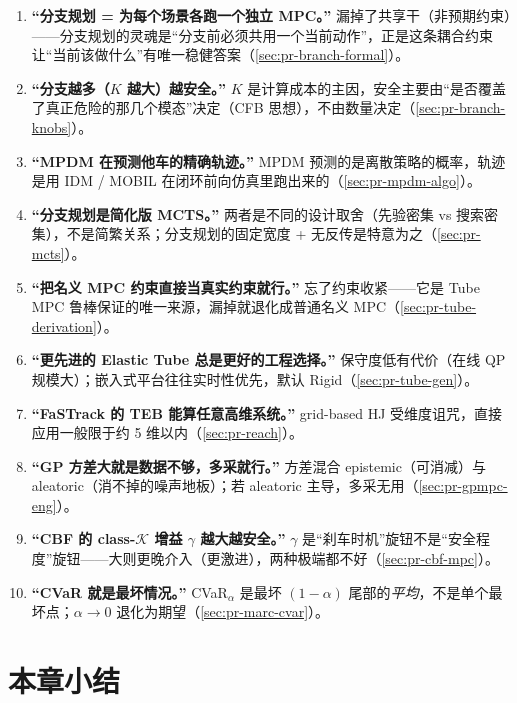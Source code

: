 \begin{enumerate}
  \item \textbf{“分支规划 = 为每个场景各跑一个独立 MPC。”} 漏掉了共享干（非预期约束）——分支规划的灵魂是“分支前必须共用一个当前动作”，正是这条耦合约束让“当前该做什么”有唯一稳健答案（\cref{sec:pr-branch-formal}）。
  \item \textbf{“分支越多（$K$ 越大）越安全。”} $K$ 是计算成本的主因，安全主要由“是否覆盖了真正危险的那几个模态”决定（CFB 思想），不由数量决定（\cref{sec:pr-branch-knobs}）。
  \item \textbf{“MPDM 在预测他车的精确轨迹。”} MPDM 预测的是离散策略的概率，轨迹是用 IDM / MOBIL 在闭环前向仿真里跑出来的（\cref{sec:pr-mpdm-algo}）。
  \item \textbf{“分支规划是简化版 MCTS。”} 两者是不同的设计取舍（先验密集 vs 搜索密集），不是简繁关系；分支规划的固定宽度 + 无反传是特意为之（\cref{sec:pr-mcts}）。
  \item \textbf{“把名义 MPC 约束直接当真实约束就行。”} 忘了约束收紧——它是 Tube MPC 鲁棒保证的唯一来源，漏掉就退化成普通名义 MPC（\cref{sec:pr-tube-derivation}）。
  \item \textbf{“更先进的 Elastic Tube 总是更好的工程选择。”} 保守度低有代价（在线 QP 规模大）；嵌入式平台往往实时性优先，默认 Rigid（\cref{sec:pr-tube-gen}）。
  \item \textbf{“FaSTrack 的 TEB 能算任意高维系统。”} grid-based HJ 受维度诅咒，直接应用一般限于约 5 维以内（\cref{sec:pr-reach}）。
  \item \textbf{“GP 方差大就是数据不够，多采就行。”} 方差混合 epistemic（可消减）与 aleatoric（消不掉的噪声地板）；若 aleatoric 主导，多采无用（\cref{sec:pr-gpmpc-eng}）。
  \item \textbf{“CBF 的 class-$\mathcal{K}$ 增益 $\gamma$ 越大越安全。”} $\gamma$ 是“刹车时机”旋钮不是“安全程度”旋钮——大则更晚介入（更激进），两种极端都不好（\cref{sec:pr-cbf-mpc}）。
  \item \textbf{“CVaR 就是最坏情况。”} CVaR$_\alpha$ 是最坏 $(1-\alpha)$ 尾部的\emph{平均}，不是单个最坏点；$\alpha\to0$ 退化为期望（\cref{sec:pr-marc-cvar}）。
\end{enumerate}

\section*{本章小结}

